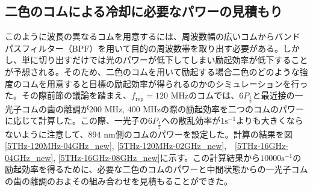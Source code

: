 \documentclass[uplatex, dvipdfmx, a4paper, report, papersize, 11pt]{jsbook}
\begin{document}
\subsection{二色のコムによる冷却に必要なパワーの見積もり}
このように波長の異なるコムを用意するには、周波数幅の広いコムからバンドパスフィルター（BPF）を用いて目的の周波数帯を取り出す必要がある。しかし、単に切り出すだけでは光のパワーが低下してしまい励起効率が低下することが予想される。そのため、二色のコムを用いて励起する場合二色のどのような強度のコムを用意すると目標の励起効率が得られるのかのシミュレーションを行った。その際前節の議論を踏まえ、$f_{\mathrm{rep}} = 120$ MHzのコムでは、$6P_{\frac{1}{2}}$と最近接の一光子コムの歯の離調が$200$ MHz, $400$ MHzの際の励起効率を二つのコムのパワーに応じて計算した。この際、一光子の$6P_{\frac{1}{2}}$への散乱効率が$1 \mathrm{s^{-1}}$よりも大きくならないように注意して、$894$ nm側のコムのパワーを設定した。計算の結果を図\ref{5THz-120MHz-04GHz_new}, \ref{5THz-120MHz-02GHz_new},　\ref{5THz-16GHz-04GHz_new}, \ref{5THz-16GHz-08GHz_new}に示す。この計算結果から$10000 \mathrm{s^{-1}}$の励起効率を得るために、必要な二色のコムのパワーと中間状態からの一光子コムの歯の離調のおよその組み合わせを見積もることができた。\\
\end{document}
